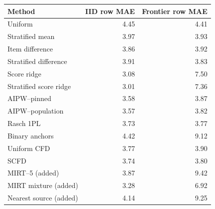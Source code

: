 \begin{tabular}{lrr}
\toprule
Method & IID row MAE & Frontier row MAE \\
\midrule
Uniform & 4.45 & 4.41 \\
Stratified mean & 3.97 & 3.93 \\
Item difference & 3.86 & 3.92 \\
Stratified difference & 3.91 & 3.83 \\
Score ridge & 3.08 & 7.50 \\
Stratified score ridge & 3.01 & 7.36 \\
AIPW--pinned & 3.58 & 3.87 \\
AIPW--population & 3.57 & 3.82 \\
Rasch 1PL & 3.73 & 3.77 \\
Binary anchors & 4.42 & 9.12 \\
Uniform CFD & 3.77 & 3.90 \\
SCFD & 3.74 & 3.80 \\
MIRT--5 (added) & 3.87 & 9.42 \\
MIRT mixture (added) & 3.28 & 6.92 \\
Nearest source (added) & 4.14 & 9.25 \\
\bottomrule
\end{tabular}
